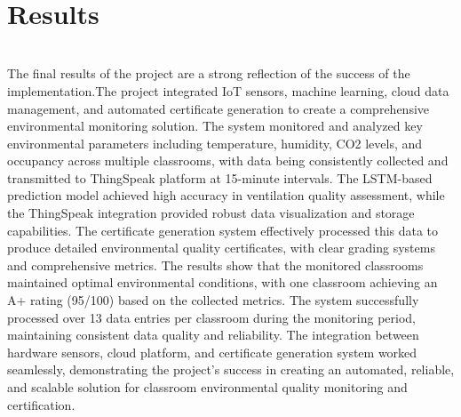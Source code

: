 \\



\section{Results }
\\
The final results of the project are a strong reflection of the success of the implementation.The project integrated IoT sensors, machine learning, cloud data management, and automated certificate generation to create a comprehensive environmental monitoring solution. The system monitored and analyzed key environmental parameters including temperature, humidity, CO2 levels, and occupancy across multiple classrooms, with data being consistently collected and transmitted to ThingSpeak platform at 15-minute intervals. The LSTM-based prediction model achieved high accuracy in ventilation quality assessment, while the ThingSpeak integration provided robust data visualization and storage capabilities. The certificate generation system effectively processed this data to produce detailed environmental quality certificates, with clear grading systems and comprehensive metrics.
The results show that the monitored classrooms maintained optimal environmental conditions, with one classroom achieving an A+ rating (95/100) based on the collected metrics. The system successfully processed over 13 data entries per classroom during the monitoring period, maintaining consistent data quality and reliability. The integration between hardware sensors, cloud platform, and certificate generation system worked seamlessly, demonstrating the project's success in creating an automated, reliable, and scalable solution for classroom environmental quality monitoring and certification.

